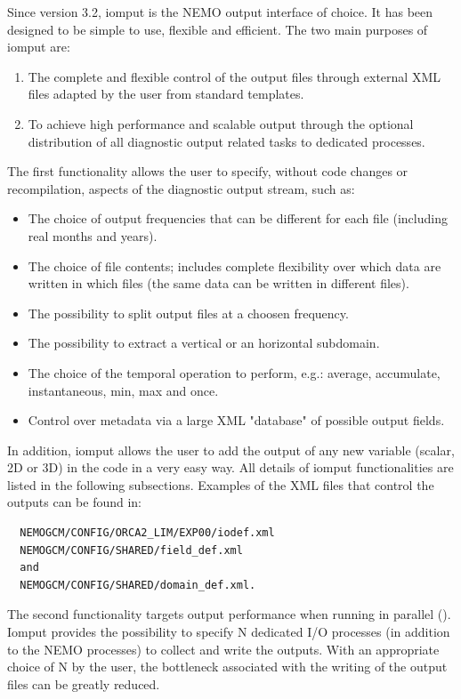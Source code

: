 Since version 3.2, iomput is the NEMO output interface of choice. It has been designed to be simple to use, flexible and efficient. The two main purposes of iomput are: 
\begin{enumerate}
\item The complete and flexible control of the output files through external XML files adapted by the user from standard templates. 
\item To achieve high performance and scalable output through the optional distribution of all diagnostic output related tasks to dedicated processes. 
\end{enumerate}
The first functionality allows the user to specify, without code changes or recompilation, aspects of the diagnostic output stream, such as:
\begin{itemize}
\item The choice of output frequencies that can be different for each file (including real months and years).
\item The choice of file contents; includes complete flexibility over which data are written in which files (the same data can be written in different files). 
\item The possibility to split output files at a choosen frequency.
\item The possibility to extract a vertical or an horizontal subdomain.
\item The choice of the temporal operation to perform, e.g.: average, accumulate, instantaneous, min, max and once.
\item Control over metadata via a large XML "database" of possible output fields.
\end{itemize}
In addition, iomput allows the user to add the output of any new variable (scalar, 2D or 3D) in the code in a very easy way. All details of iomput functionalities are listed in the following subsections. Examples of the XML files that control the outputs can be found in:
\begin{alltt}
\begin{verbatim}
  NEMOGCM/CONFIG/ORCA2_LIM/EXP00/iodef.xml
  NEMOGCM/CONFIG/SHARED/field_def.xml
  and
  NEMOGCM/CONFIG/SHARED/domain_def.xml.
\end{verbatim}
\end{alltt}

The second functionality targets output performance when running in parallel (). Iomput provides the possibility to specify N dedicated I/O processes (in addition to the NEMO processes) to collect and write the outputs. With an appropriate choice of N by the user, the bottleneck associated with the writing of the output files can be greatly reduced. 

